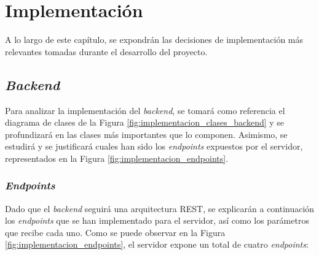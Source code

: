 \chapter{Implementación}
\label{chap:implementacion}

A lo largo de este capítulo, se expondrán las decisiones de implementación más relevantes tomadas durante el desarrollo del proyecto.

\section{\textit{Backend}}

Para analizar la implementación del \textit{backend}, se tomará como referencia el diagrama de clases de la Figura \ref{fig:implementacion_clases_backend} y se profundizará
en las clases más importantes que lo componen. Asimismo, se estudirá y se justificará cuales han sido los \textit{endpoints} expuestos por el servidor,
representados en la Figura \ref{fig:implementacion_endpoints}.

\subsection{\textit{Endpoints}}

Dado que el \textit{backend} seguirá una arquitectura REST, se explicarán a continuación los \textit{endpoints} que se han implementado para el servidor, así como los parámetros
que recibe cada uno. Como se puede observar en la Figura \ref{fig:implementacion_endpoints}, el servidor expone un total de cuatro \textit{endpoints}:

